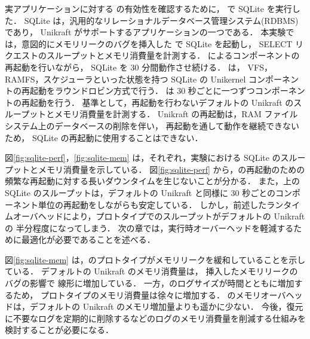 実アプリケーションに対する \sysname の有効性を確認するために，
\sysname で SQLite を実行した．
SQLite は，汎用的なリレーショナルデータベース管理システム(RDBMS)であり，
Unikraft がサポートするアプリケーションの一つである．
本実験では，意図的にメモリリークのバグを挿入した \sysname で SQLite を起動し，
SELECT リクエストのスループットとメモリ消費量を計測する．
\sysname によるコンポーネントの再起動を行いながら，
SQLite を 30 分間動作させ続ける．
\sysname は，
VFS，RAMFS，スケジューラといった状態を持つ SQLite の Unikernel コンポーネントの再起動をラウンドロビン方式で行う．
\sysname は 30 秒ごとに一つずつコンポーネントの再起動を行う．
基準として，再起動を行わないデフォルトの Unikraft のスループットとメモリ消費量を計測する．
Unikraft の再起動は，RAM ファイルシステム上のデータベースの削除を伴い，
再起動を通して動作を継続できないため，
SQLite の再起動に使用することはできない．

図\ref{fig:sqlite-perf}，\ref{fig:sqlite-mem} は，それぞれ，実験における SQLite のスループットとメモリ消費量を示している．
図\ref{fig:sqlite-perf} から，\sysname の再起動のための頻繁な再起動に対する長いダウンタイムを生じないことが分かる．
また，\sysname 上の SQLite のスループットは，デフォルトの Unikraft と同様に 30 秒ごとのコンポーネント単位の再起動をしながらも安定している．
しかし，前述したランタイムオーバヘッドにより，プロトタイプでのスループットがデフォルトの Unikraft の 半分程度になってしまう．
次の章では，実行時オーバーヘッドを軽減するために最適化が必要であることを述べる．


図\ref{fig:sqlite-mem} は，\sysname のプロトタイプがメモリリークを緩和していることを示している．
デフォルトの Unikraft のメモリ消費量は，
挿入したメモリリークのバグの影響で
線形に増加している．
一方，\sysname のログサイズが時間とともに増加するため，
プロトタイプのメモリ消費量は徐々に増加する．
\sysname のメモリオーバヘッドは，デフォルトの Unikraft のメモリ増加量よりも遥かに少ない．
今後，復元に不要なログを定期的に削除するなどのログのメモリ消費量を削減する仕組みを検討することが必要になる．
